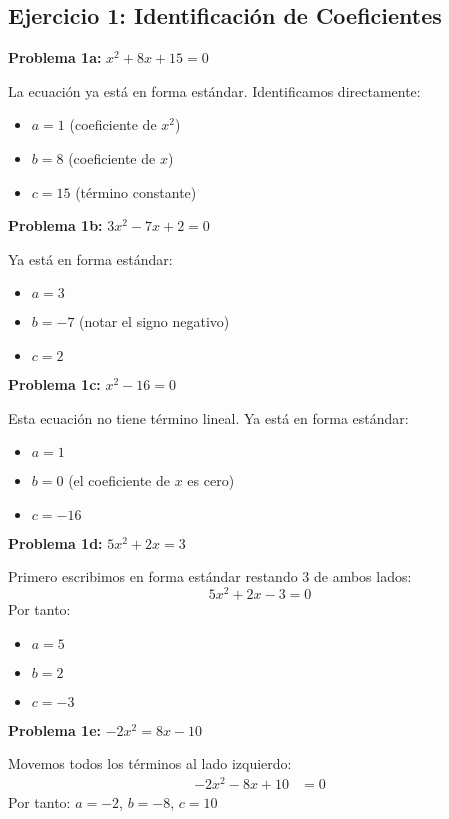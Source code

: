 
\subsection*{Ejercicio 1: Identificación de Coeficientes}

\textbf{Problema 1a:} $x^2 + 8x + 15 = 0$

La ecuación ya está en forma estándar. Identificamos directamente:
\begin{itemize}
\item $a = 1$ (coeficiente de $x^2$)
\item $b = 8$ (coeficiente de $x$)
\item $c = 15$ (término constante)
\end{itemize}

\textbf{Problema 1b:} $3x^2 - 7x + 2 = 0$

Ya está en forma estándar:
\begin{itemize}
\item $a = 3$
\item $b = -7$ (notar el signo negativo)
\item $c = 2$
\end{itemize}

\textbf{Problema 1c:} $x^2 - 16 = 0$

Esta ecuación no tiene término lineal. Ya está en forma estándar:
\begin{itemize}
\item $a = 1$
\item $b = 0$ (el coeficiente de $x$ es cero)
\item $c = -16$
\end{itemize}

\textbf{Problema 1d:} $5x^2 + 2x = 3$

Primero escribimos en forma estándar restando 3 de ambos lados:
$$5x^2 + 2x - 3 = 0$$
Por tanto:
\begin{itemize}
\item $a = 5$
\item $b = 2$
\item $c = -3$
\end{itemize}

\textbf{Problema 1e:} $-2x^2 = 8x - 10$

Movemos todos los términos al lado izquierdo:
\begin{align}
-2x^2 - 8x + 10 &= 0
\end{align}
Por tanto: $a = -2$, $b = -8$, $c = 10$


